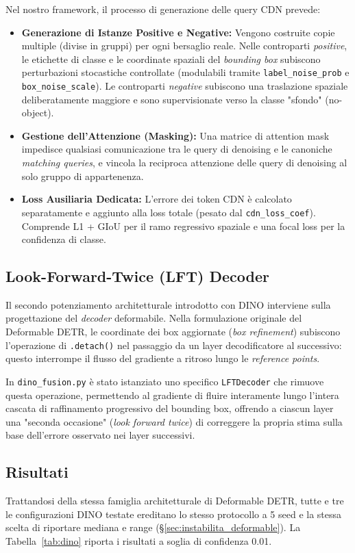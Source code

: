 \documentclass[a4paper,11pt]{article}
\begin{document}
Nel nostro framework, il processo di generazione delle query CDN prevede:
\begin{itemize}
    \item \textbf{Generazione di Istanze Positive e Negative:} Vengono costruite copie multiple (divise in gruppi) per ogni bersaglio reale. Nelle controparti \textit{positive}, le etichette di classe e le coordinate spaziali del \textit{bounding box} subiscono perturbazioni stocastiche controllate (modulabili tramite \texttt{label\_noise\_prob} e \texttt{box\_noise\_scale}). Le controparti \textit{negative} subiscono una traslazione spaziale deliberatamente maggiore e sono supervisionate verso la classe "sfondo" (no-object).
    \item \textbf{Gestione dell'Attenzione (Masking):} Una matrice di attention mask impedisce qualsiasi comunicazione tra le query di denoising e le canoniche \textit{matching queries}, e vincola la reciproca attenzione delle query di denoising al solo gruppo di appartenenza.
    \item \textbf{Loss Ausiliaria Dedicata:} L'errore dei token CDN è calcolato separatamente e aggiunto alla loss totale (pesato dal \texttt{cdn\_loss\_coef}). Comprende L1 + GIoU per il ramo regressivo spaziale e una focal loss per la confidenza di classe.
\end{itemize}

\subsection{Look-Forward-Twice (LFT) Decoder}
Il secondo potenziamento architetturale introdotto con DINO interviene sulla progettazione del \textit{decoder} deformabile. Nella formulazione originale del Deformable DETR, le coordinate dei box aggiornate (\textit{box refinement}) subiscono l'operazione di \texttt{.detach()} nel passaggio da un layer decodificatore al successivo: questo interrompe il flusso del gradiente a ritroso lungo le \textit{reference points}.

In \texttt{dino\_fusion.py} è stato istanziato uno specifico \texttt{LFTDecoder} che rimuove questa operazione, permettendo al gradiente di fluire interamente lungo l'intera cascata di raffinamento progressivo del bounding box, offrendo a ciascun layer una "seconda occasione" (\textit{look forward twice}) di correggere la propria stima sulla base dell'errore osservato nei layer successivi.

\subsection{Risultati}
Trattandosi della stessa famiglia architetturale di Deformable DETR, tutte e tre le configurazioni DINO testate ereditano lo stesso protocollo a 5 seed e la stessa scelta di riportare mediana e range (\S\ref{sec:instabilita_deformable}). La Tabella~\ref{tab:dino} riporta i risultati a soglia di confidenza 0.01.
\end{document}

